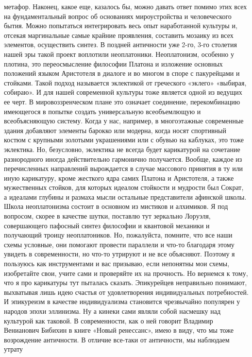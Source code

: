 метафор. Наконец, какое еще, казалось бы, можно давать ответ помимо этих всех на
фундаментальный вопрос об основаниях мироустройства и человеческого бытия. Можно
попытаться интегрировать весь опыт наработанной культуры и, отсекая маргинальные
самые крайние проявления, составить мозаику из всех элементов, осуществить
синтез. В поздней античности уже 2-го, 3-го столетия нашей эры такой проект
воплотили неоплатоники. Неоплатонизм, особенно у плотина, это переосмысление
философии Платона и изложение основных положений языком Аристотеля в диалоге и
во многом в споре с пакурейцами и стойками. Такой подход называется эклектикой
от греческого «эклего» «выбирая, собираю». И для нашей современной культуры тоже
является одной из ведущих ее черт. В мировоззренческом плане это означает
соединение, перекомбинацию имеющегося в попытке создать универсальную
всеобъемлющую и всеобъясняющую систему. Когда у нас, например, в многоэтажные
современные здания добавляют элементы барокко или модерна, когда носят
спортивный костюм с крупными золотыми украшениями или с обувью на каблуках, это
тоже эклектика. Но, безусловно, эклектика не всегда будет карикатурой на
сочетание разнородного иногда действительно гармонично получается. Вообще,
каждое из перечисленных направлений вырождается в случае массового принятия в ту
или иную карикатуру, кроме жесткого ядра самих Платона и Аристотеля, а также
мужественных стойков, для которых идеалом стойкости и мудрости был Сократ, а
идеалами глубины и размаха мысли остальные представители афинской школы. Школа
неоплатонизма состоит в основном из мистиков и алхимиков. Я под вопросом, скорее
в качестве шутки, поставлю тут зеркально Лоруэля, совершающего пафосный синтез
философии и квантовой механики и получающий троицу неоплатоников. Но,
пожалуйста, помните, что все наши схемы условные, они помогают провести
параллели и что-то благодаря этому увидеть в современности, но что-то утрируют и
не все объясняют. Поэтому я пользуюсь как инструментами и вас призываю, если
непонятны мои схемы, изобретайте свои, учите сами и проверяйте их на прочность.
Но вернемся к тому, что я про карикатуры тут пыталась сказать. Эпикурейцев
неправильно понимают, выхватывая лишь идею счастья от удовлетворения
индивидуальных потребностей. И эпикуреизм в качестве индивидуализма становится
чрезвычайно популярен у народов эпохи эллинизма. Ну а кинеки сами являли собой
насмешку над культурой как таковой. В современности, как о ней говорит Владимир
Венианович Бибихин в книге «Новый ренессанс», имею в виду, что мы тоже
возрождение античности. В отличие все-таки от античности, мы наблюдаем утрату
